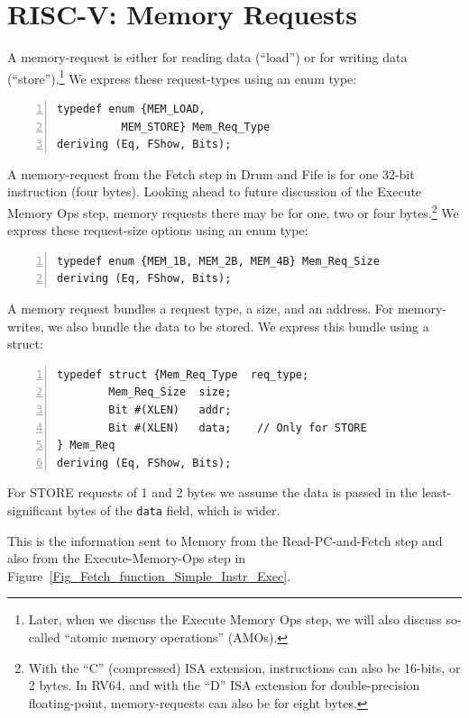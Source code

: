 
\section{RISC-V: Memory Requests}


A memory-request is either for reading data (``load'') or for writing
data (``store'').\footnote{Later, when we discuss the Execute Memory
Ops step, we will also discuss so-called ``atomic memory operations''
(AMOs).} We express these request-types using an enum type:

\begin{Verbatim}[frame=single, numbers=left]
typedef enum {MEM_LOAD,
	      MEM_STORE} Mem_Req_Type
deriving (Eq, FShow, Bits);
\end{Verbatim}

A memory-request from the Fetch step in Drum and Fife is for one
32-bit instruction (four bytes). Looking ahead to future discussion of
the Execute Memory Ops step, memory requests there may be for one, two
or four bytes.\footnote{With the ``C'' (compressed) ISA extension,
instructions can also be 16-bits, or 2 bytes.  In RV64, and with the
``D'' ISA extension for double-precision floating-point,
memory-requests can also be for eight bytes.}  We express these
request-size options using an enum type:

\begin{Verbatim}[frame=single, numbers=left]
typedef enum {MEM_1B, MEM_2B, MEM_4B} Mem_Req_Size
deriving (Eq, FShow, Bits);
\end{Verbatim}

A memory request bundles a request type, a size, and an address.  For
memory-writes, we also bundle the data to be stored.  We express this
bundle using a struct:

\begin{Verbatim}[frame=single, numbers=left]
typedef struct {Mem_Req_Type  req_type;
		Mem_Req_Size  size;
		Bit #(XLEN)   addr;
		Bit #(XLEN)   data;    // Only for STORE
} Mem_Req
deriving (Eq, FShow, Bits);
\end{Verbatim}

For STORE requests of 1 and 2 bytes we assume the data is passed in
the least-significant bytes of the \verb|data| field, which is wider.

This is the information sent to Memory from the Read-PC-and-Fetch step
and also from the Execute-Memory-Ops step in
Figure~\ref{Fig_Fetch_function_Simple_Instr_Exec}.

